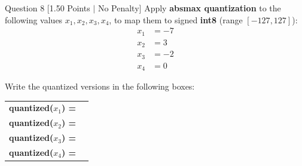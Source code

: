 \documentclass[11pt,a4paper]{article}
\begin{document}
\begin{questionbox}{Question 8 \hfill [1.50 Points $\vert$ No Penalty]}
Apply \textbf{absmax quantization} to the following values $x_1, x_2, x_3, x_4$, to map them to signed \textbf{int8} (range $[-127, 127]$):
\begin{align*}
    x_1 &= -7 \\
    x_2 &= 3 \\
    x_3 &= -2 \\
    x_4 &= 0
\end{align*}

Write the quantized versions in the following boxes:

\medskip
\begin{tabular}{ll}
\textbf{quantized($x_1$) =} & \underline{\hspace{4cm}} \\
\textbf{quantized($x_2$) =} & \underline{\hspace{4cm}} \\
\textbf{quantized($x_3$) =} & \underline{\hspace{4cm}} \\
\textbf{quantized($x_4$) =} & \underline{\hspace{4cm}} \\
\end{tabular}
\end{questionbox}

\newpage
\end{document}
